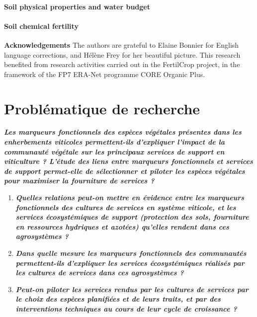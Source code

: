 \paragraph{Soil physical properties and water budget}

\paragraph{Soil chemical fertility}


\textbf{Acknowledgements}
The authors are grateful to Elaine Bonnier for English language corrections, and Hélène Frey for her beautiful picture. This research benefited from research activities carried out in the FertilCrop project, in the framework of the FP7 ERA-Net programme CORE Organic Plus. 

\section[Problématique]{Problématique de recherche}


\medskip
\noindent\textbf{\textit{Les marqueurs fonctionnels des espèces végétales présentes dans les enherbements viticoles permettent-ils d'expliquer l'impact de la communauté végétale sur les principaux services de support en viticulture ? L'étude des liens entre marqueurs fonctionnels et services de support permet-elle de sélectionner et piloter les espèces végétales pour maximiser la fourniture de services ?}}
\medskip


\begin{enumerate}[leftmargin=*]
\item \textbf{\textit{Quelles relations peut-on mettre en évidence entre les marqueurs fonctionnels des cultures de services en système viticole, et les services écosystémiques de support (protection des sols, fourniture en ressources hydriques et azotées) qu'elles rendent dans ces agrosystèmes ?}}
\item \textbf{\textit{Dans quelle mesure les marqueurs fonctionnels des communautés permettent-ils d'expliquer les services écosystémiques réalisés par les cultures de services dans ces agrosystèmes ?}}
\item \textbf{\textit{Peut-on piloter les services rendus par les cultures de services par le choix des espèces planifiées et de leurs traits, et par des interventions techniques au cours de leur cycle de croissance ?}}
\end{enumerate}


